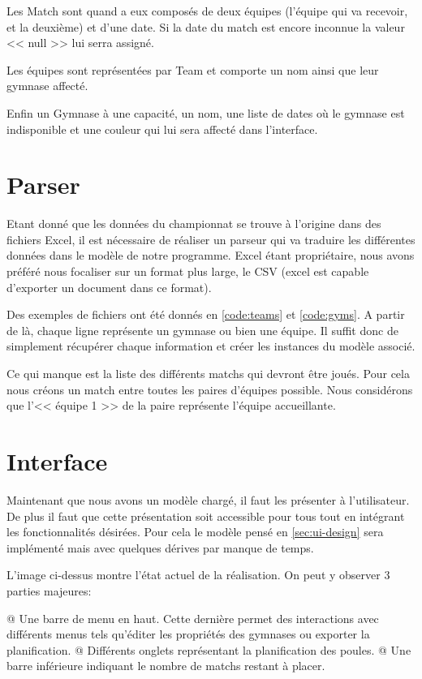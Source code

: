 \documentclass[final, noposter]{polytech/polytech}
\begin{document}
		Les Match sont quand a eux composés de deux équipes (l'équipe qui va recevoir, et la deuxième) et d'une date.
		Si la date du match est encore inconnue la valeur << null >> lui serra assigné.
		
		Les équipes sont représentées par Team et comporte un nom ainsi que leur gymnase affecté.

		Enfin un Gymnase à une capacité, un nom, une liste de dates où le gymnase est indisponible et une couleur qui lui sera affecté dans l'interface.

	\section{Parser}
		Etant donné que les données du championnat se trouve à l'origine dans des fichiers Excel, il est nécessaire de réaliser un parseur qui va traduire les différentes données dans le modèle de notre programme.
		Excel étant propriétaire, nous avons préféré nous focaliser sur un format plus large, le CSV (excel est capable d'exporter un document dans ce format).
		
		Des exemples de fichiers ont été donnés en \autoref{code:teams} et \autoref{code:gyms}.
		A partir de là, chaque ligne représente un gymnase ou bien une équipe.
		Il suffit donc de simplement récupérer chaque information et créer les instances du modèle associé.
		
		Ce qui manque est la liste des différents matchs qui devront être joués.
		Pour cela nous créons un match entre toutes les paires d'équipes possible.
		Nous considérons que l'<< équipe 1 >> de la paire représente l'équipe accueillante.
	
	\section{Interface}
		Maintenant que nous avons un modèle chargé, il faut les présenter à l'utilisateur.
		De plus il faut que cette présentation soit accessible pour tous tout en intégrant les fonctionnalités désirées.
		Pour cela le modèle pensé en \autoref{sec:ui-design} sera implémenté mais avec quelques dérives par manque de temps.
		
		
		L'image ci-dessus montre l'état actuel de la réalisation.
		On peut y observer 3 parties majeures:
		\begin{easylist}[itemize]
			@ Une barre de menu en haut.
			Cette dernière permet des interactions avec différents menus tels qu'éditer les propriétés des gymnases ou exporter la planification.
			@ Différents onglets représentant la planification des poules.
			@ Une barre inférieure indiquant le nombre de matchs restant à placer.
		\end{easylist}
	
\end{document}
